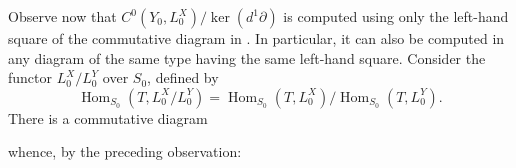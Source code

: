 Observe now that
\(C^0(Y_0,L_0^X)/\ker(d^1\partial)\) is computed using only the left-hand
square of the commutative diagram in . In particular, it can also
be computed in any diagram of the same type having the same left-hand
square. Consider the functor \(L_0^X/L_0^Y\) over \(S_0\), defined by
\[
 \operatorname{Hom}_{S_0}(T,L_0^X/L_0^Y)
 =\operatorname{Hom}_{S_0}(T,L_0^X)
  \big/\operatorname{Hom}_{S_0}(T,L_0^Y).
\]
There is a commutative diagram

\begin{center}
\end{center}

whence, by the preceding observation:

